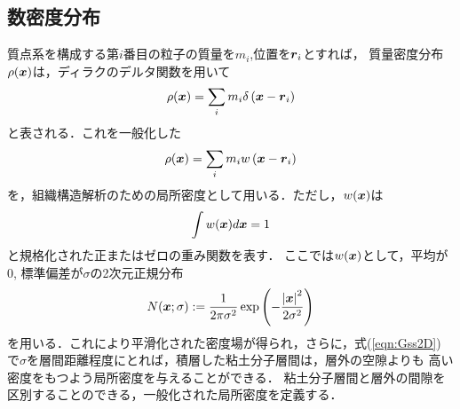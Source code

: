 \subsection{数密度分布}
質点系を構成する第$i$番目の粒子の質量を$m_i$,位置を$\mbox{\boldmath $r$}_i$とすれば，
質量密度分布$\rho(\mbox{\boldmath $x$})$は，ディラクのデルタ関数を用いて
\begin{equation}
	\rho(\mbox{\boldmath $x$})=\sum_{i} m_i\delta\left(\mbox{\boldmath $x$}-\mbox{\boldmath $r$}_i\right)
\end{equation}
と表される．これを一般化した
\begin{equation}
	\rho(\mbox{\boldmath $x$})=\sum_{i} m_i w\left(\mbox{\boldmath $x$}-\mbox{\boldmath $r$}_i\right)
	\label{eqn:rhox_gen}
\end{equation}
を，組織構造解析のための局所密度として用いる．ただし，$w(\mbox{\boldmath $x$})$は
\begin{equation}
	\int w(\mbox{\boldmath $x$}) d\mbox{\boldmath $x$} =1
\end{equation}
と規格化された正またはゼロの重み関数を表す．
ここでは$w(\mbox{\boldmath $x$})$として，平均が0, 標準偏差が$\sigma$の2次元正規分布
\begin{equation}
	N(\mbox{\boldmath $x$};\sigma):=
	\frac{1}{2\pi\sigma^2}
	\exp\left(
		-\frac{\left|\mbox{\boldmath $x$}\right|^2}{2\sigma^2}
	\right)
	\label{eqn:Gss2D}
\end{equation}
を用いる．これにより平滑化された密度場が得られ，さらに，式(\ref{eqn:Gss2D})
で$\sigma$を層間距離程度にとれば，積層した粘土分子層間は，層外の空隙よりも
高い密度をもつよう局所密度を与えることができる．
粘土分子層間と層外の間隙を区別することのできる，一般化された局所密度を定義する．
